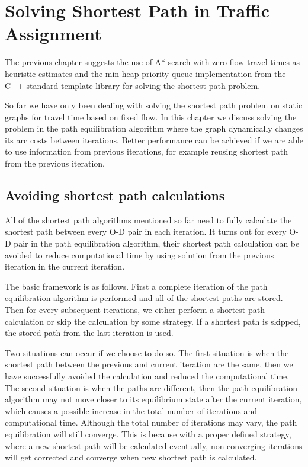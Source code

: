 \chapter{Solving Shortest Path in Traffic Assignment} \label{chap:iterative}
The previous chapter suggests the use of A* search with zero-flow travel times as heuristic estimates and the min-heap priority queue implementation from the C++ standard template library for solving the shortest path problem.

So far we have only been dealing with solving the shortest path problem on static graphs for travel time based on fixed flow.
In this chapter we discuss solving the problem in the path equilibration algorithm where
the graph dynamically changes its arc costs between iterations.
Better performance can be achieved if we are able to use information from previous iterations, for example reusing shortest path from the previous iteration.

\section{Avoiding shortest path calculations} \label{section:avoid}
All of the shortest path algorithms mentioned so far need to fully calculate the shortest path between every O-D pair in each iteration.
It turns out for every O-D pair in the path equilibration algorithm,
their shortest path calculation can be avoided to reduce computational time by using solution from the previous iteration in the current iteration.

The basic framework is as follows.
First a complete iteration of the path equilibration algorithm is performed and all of the shortest paths are stored.
Then for every subsequent iterations,
we either perform a shortest path calculation or skip the calculation by some strategy.
If a shortest path is skipped, the stored path from the last iteration is used.

Two situations can occur if we choose to do so.
The first situation is when the shortest path between the previous and current iteration are the same,
then we have successfully avoided the calculation and reduced the computational time.
The second situation is when the paths are different,
then the path equilibration algorithm may not move closer to its equilibrium state after the current iteration,
which causes a possible increase in the total number of iterations and computational time.
Although the total number of iterations may vary,
the path equilibration will still converge.
This is because with a proper defined strategy,
where a new shortest path will be calculated eventually, non-converging iterations will get corrected and converge when new shortest path is calculated.

